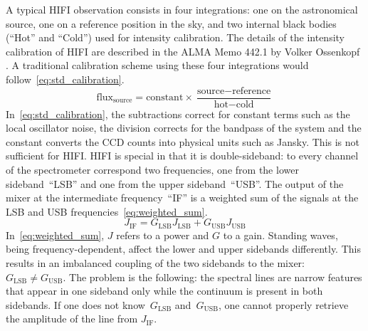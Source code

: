 \documentclass[journal]{IEEEtran}
\begin{document}
A typical HIFI observation consists in four integrations: one on the astronomical source, one on a reference position in the sky, and two internal black bodies (``Hot'' and ``Cold'') used for intensity calibration.
The details of the intensity calibration of HIFI are described in the ALMA Memo 442.1 by Volker Ossenkopf \cite{ossenkopf2002intensity}.
A traditional calibration scheme using these four integrations would follow~\eqref{eq:std_calibration}.
\begin{equation}
    \text{flux}_\text{source} = 
    \text{constant}
    \times
    \frac{\text{source} - \text{reference}}{\text{hot} - \text{cold}}
    \label{eq:std_calibration}
\end{equation}
In~\eqref{eq:std_calibration}, the subtractions correct for constant terms such as the local oscillator noise, the division corrects for the bandpass of the system and the constant converts the CCD counts into physical units such as Jansky.
This is not sufficient for HIFI.
HIFI is special in that it is double-sideband: to every channel of the spectrometer correspond two frequencies, one from the lower sideband~``LSB'' and one from the upper sideband~``USB''.
The output of the mixer at the intermediate frequency~``IF'' is a weighted sum of the signals at the LSB and USB frequencies~\eqref{eq:weighted_sum}.
\begin{equation}
    J_\text{IF} = G_\text{LSB} J_\text{LSB} + G_\text{USB} J_\text{USB}
    \label{eq:weighted_sum}
\end{equation}
In~\eqref{eq:weighted_sum}, $J$ refers to a power and $G$ to a gain.
Standing waves, being frequency-dependent, affect the lower and upper sidebands differently.
This results in an imbalanced coupling of the two sidebands to the mixer: $G_\text{LSB} \neq G_\text{USB}$.
The problem is the following: the spectral lines are narrow features that appear in one sideband only while the continuum is present in both sidebands.
If one does not know~$G_\text{LSB}$ and~$G_\text{USB}$, one cannot properly retrieve the amplitude of the line from $J_\text{IF}$.
\end{document}
